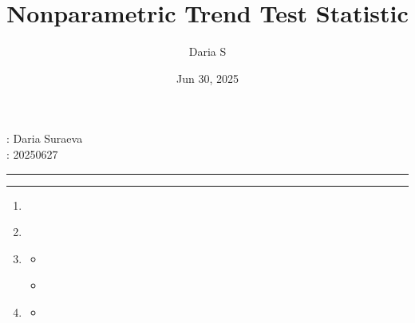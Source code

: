 \documentclass[letterpaper,10pt,english]{jupyterBook}
\title{Nonparametric Trend Test Statistic}
\date{Jun 30, 2025}
\author{Daria S}
\begin{document}
\pagestyle{empty}
\sphinxmaketitle
\pagestyle{plain}
\sphinxtableofcontents
\pagestyle{normal}
\label{\detokenize{intro::doc}}


\sphinxAtStartPar
{}: Daria Suraeva\\
: 2025\sphinxhyphen{}06\sphinxhyphen{}27


\bigskip\hrule\bigskip



\bigskip\hrule\bigskip


\begin{DUlineblock}{0em}
\item[] 
\end{DUlineblock}
\begin{enumerate}
%
\item {} 
\sphinxAtStartPar
{\hyperref[\detokenize{intro:1-introduction}]{}}

\item {} 
\sphinxAtStartPar
{\hyperref[\detokenize{function::doc}]{}}

\item {} 
\sphinxAtStartPar
{\hyperref[\detokenize{intro:methodology.md}]{}}
\begin{itemize}
\item {} 
 {\hyperref[\detokenize{intro:methodology.md:independent-samples}]{}}

\item {} 
 {\hyperref[\detokenize{intro:methodology.md:dependent-samples}]{}}

\end{itemize}

\item {} 
\sphinxAtStartPar
{\hyperref[\detokenize{intro:simulation.md}]{}}
\begin{itemize}
\item {} 
 {\hyperref[\detokenize{intro:simulation.md:table-1-and-table-3-replication}]{}}


\end{itemize}
\end{enumerate}
\end{document}
